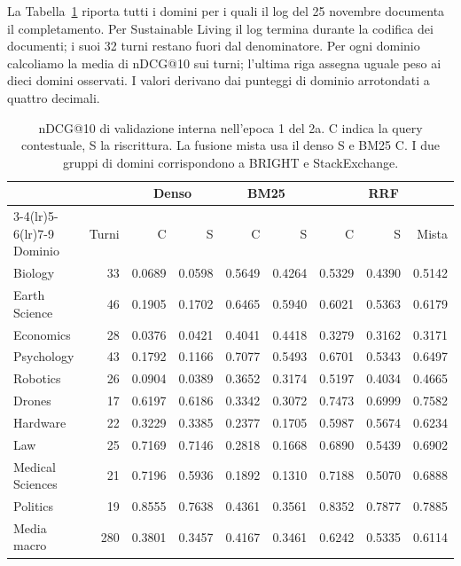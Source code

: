 La Tabella~\ref{tab:domains} riporta tutti i domini per i quali il log del 25 novembre documenta il completamento. Per Sustainable Living il log termina durante la codifica dei documenti; i suoi 32 turni restano fuori dal denominatore. Per ogni dominio calcoliamo la media di nDCG@10 sui turni; l'ultima riga assegna uguale peso ai dieci domini osservati. I valori derivano dai punteggi di dominio arrotondati a quattro decimali.
\begin{table}[htbp]\centering\small
\caption{nDCG@10 di validazione interna nell'epoca 1 del 2a. C indica la query contestuale, S la riscrittura. La fusione mista usa il denso S e BM25 C. I due gruppi di domini corrispondono a BRIGHT e StackExchange.}\label{tab:domains}
\setlength{\tabcolsep}{3pt}
\begin{tabular}{lr rr rr rrr}\toprule
& & \multicolumn{2}{c}{Denso} & \multicolumn{2}{c}{BM25} & \multicolumn{3}{c}{RRF}\\
\cmidrule(lr){3-4}\cmidrule(lr){5-6}\cmidrule(lr){7-9}
Dominio & Turni & C & S & C & S & C & S & Mista\\\midrule
Biology & 33 & 0.0689 & 0.0598 & 0.5649 & 0.4264 & 0.5329 & 0.4390 & 0.5142 \\
Earth Science & 46 & 0.1905 & 0.1702 & 0.6465 & 0.5940 & 0.6021 & 0.5363 & 0.6179 \\
Economics & 28 & 0.0376 & 0.0421 & 0.4041 & 0.4418 & 0.3279 & 0.3162 & 0.3171 \\
Psychology & 43 & 0.1792 & 0.1166 & 0.7077 & 0.5493 & 0.6701 & 0.5343 & 0.6497 \\
Robotics & 26 & 0.0904 & 0.0389 & 0.3652 & 0.3174 & 0.5197 & 0.4034 & 0.4665 \\
\midrule
Drones & 17 & 0.6197 & 0.6186 & 0.3342 & 0.3072 & 0.7473 & 0.6999 & 0.7582 \\
Hardware & 22 & 0.3229 & 0.3385 & 0.2377 & 0.1705 & 0.5987 & 0.5674 & 0.6234 \\
Law & 25 & 0.7169 & 0.7146 & 0.2818 & 0.1668 & 0.6890 & 0.5439 & 0.6902 \\
Medical Sciences & 21 & 0.7196 & 0.5936 & 0.1892 & 0.1310 & 0.7188 & 0.5070 & 0.6888 \\
Politics & 19 & 0.8555 & 0.7638 & 0.4361 & 0.3561 & 0.8352 & 0.7877 & 0.7885 \\
\midrule
Media macro & 280 & 0.3801 & 0.3457 & 0.4167 & 0.3461 & 0.6242 & 0.5335 & 0.6114 \\\bottomrule\end{tabular}\end{table}

